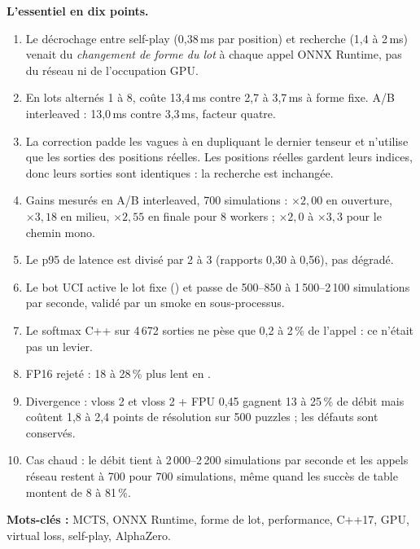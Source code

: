 \begin{essentiel}
\textbf{L'essentiel en dix points.}
\begin{enumerate}[leftmargin=1.4em,itemsep=2pt]
  \item Le d\'ecrochage entre self-play (0,38\,ms par position) et recherche
  (1,4 \`a 2\,ms) venait du \emph{changement de forme du lot} \`a chaque appel
  ONNX Runtime, pas du r\'eseau ni de l'occupation GPU.
  \item En lots altern\'es 1 \`a 8,  co\^ute 13,4\,ms
  contre 2,7 \`a 3,7\,ms \`a forme fixe. A/B interleaved : 13,0\,ms contre
  3,3\,ms, facteur quatre.
  \item La correction padde les vagues \`a  en dupliquant le
  dernier tenseur et n'utilise que les sorties des positions r\'eelles. Les
  positions r\'eelles gardent leurs indices, donc leurs sorties sont
  identiques : la recherche est inchang\'ee.
  \item Gains mesur\'es en A/B interleaved, 700 simulations : $\times 2{,}00$ en
  ouverture, $\times 3{,}18$ en milieu, $\times 2{,}55$ en finale pour 8
  workers ; $\times 2{,}0$ \`a $\times 3{,}3$ pour le chemin mono.
  \item Le p95 de latence est divis\'e par 2 \`a 3 (rapports 0,30 \`a 0,56),
  pas d\'egrad\'e.
  \item Le bot UCI active le lot fixe () et
  passe de 500--850 \`a 1\,500--2\,100 simulations par seconde, valid\'e par un
  smoke en sous-processus.
  \item Le softmax C++ sur 4\,672 sorties ne p\`ese que 0,2 \`a 2\,\% de
  l'appel : ce n'\'etait pas un levier.
  \item FP16 rejet\'e : 18 \`a 28\,\% plus lent en .
  \item Divergence : vloss 2 et vloss 2 + FPU 0,45 gagnent 13 \`a 25\,\% de
  d\'ebit mais co\^utent 1,8 \`a 2,4 points de r\'esolution sur 500 puzzles ;
  les d\'efauts sont conserv\'es.
  \item Cas chaud : le d\'ebit tient \`a 2\,000--2\,200 simulations par seconde
  et les appels r\'eseau restent \`a 700 pour 700 simulations, m\^eme quand les
  succ\`es de table montent de 8 \`a 81\,\%.
\end{enumerate}
\end{essentiel}

\vspace{0.4cm}

\noindent\textbf{Mots-cl\'es :} MCTS, ONNX Runtime, forme de lot, performance,
C++17, GPU, virtual loss, self-play, AlphaZero.

